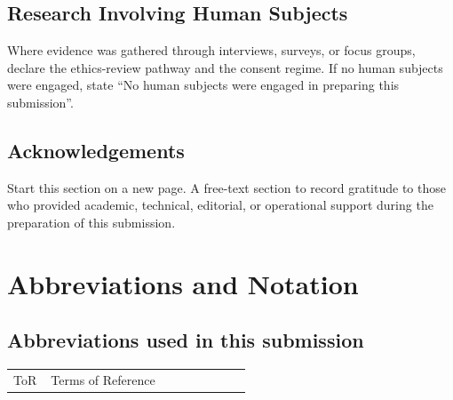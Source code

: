 \section{Research Involving Human Subjects}

\begin{instructional}
Where evidence was gathered through interviews, surveys, or focus groups, declare the ethics-review pathway and the consent regime. If no human subjects were engaged, state ``No human subjects were engaged in preparing this submission''.
\end{instructional}


\clearpage
\section{Acknowledgements}

\begin{instructional}
Start this section on a new page. A free-text section to record gratitude to those who provided academic, technical, editorial, or operational support during the preparation of this submission.
\end{instructional}


\clearpage
\tableofcontents
\clearpage
\listoffigures
\clearpage
\listoftables


\chapter[Abbreviations and Notation]{Abbreviations and Notation}

\section{Abbreviations used in this submission}
\noindent
\begin{longtable}{p{0.15\linewidth} p{0.80\linewidth}}
    ToR   & Terms of Reference                                      \\
\end{longtable}

